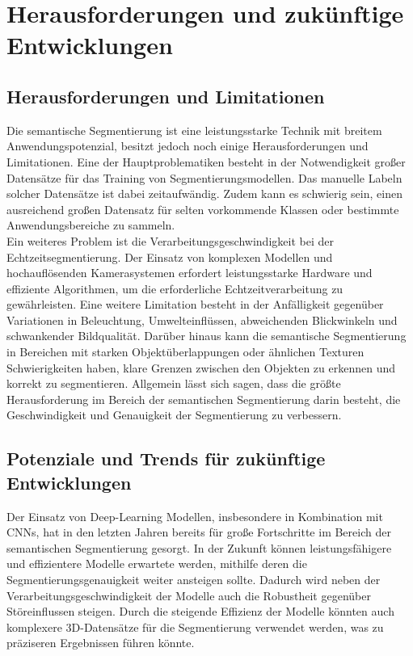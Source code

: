 \chapter{Herausforderungen und zukünftige Entwicklungen}
\section{Herausforderungen und Limitationen}
Die semantische Segmentierung ist eine leistungsstarke Technik mit breitem
Anwendungspotenzial, besitzt jedoch noch einige Herausforderungen und
Limitationen. Eine der Hauptproblematiken besteht in der Notwendigkeit großer
Datensätze für das Training von Segmentierungsmodellen. Das manuelle Labeln
solcher Datensätze ist dabei zeitaufwändig. Zudem kann es schwierig sein, einen
ausreichend großen Datensatz für selten vorkommende Klassen oder bestimmte
Anwendungsbereiche zu sammeln. \cite{hu2021towards} \\Ein weiteres Problem ist
die Verarbeitungsgeschwindigkeit bei der Echtzeitsegmentierung. Der Einsatz von
komplexen Modellen und hochauflösenden Kamerasystemen erfordert leistungsstarke
Hardware und effiziente Algorithmen, um die erforderliche Echtzeitverarbeitung
zu gewährleisten. Eine weitere Limitation besteht in der Anfälligkeit gegenüber
Variationen in Beleuchtung, Umwelteinflüssen, abweichenden Blickwinkeln und
schwankender Bildqualität. Darüber hinaus kann die semantische Segmentierung in
Bereichen mit starken Objektüberlappungen oder ähnlichen Texturen
Schwierigkeiten haben, klare Grenzen zwischen den Objekten zu erkennen und
korrekt zu segmentieren. Allgemein lässt sich sagen, dass die größte
Herausforderung im Bereich der semantischen Segmentierung darin besteht, die
Geschwindigkeit und Genauigkeit der Segmentierung zu
verbessern. \cite{20222324,9420573}

\section{Potenziale und Trends für zukünftige Entwicklungen}

Der Einsatz von Deep-Learning Modellen, insbesondere in Kombination mit CNNs,
hat in den letzten Jahren bereits für große Fortschritte im Bereich der
semantischen Segmentierung gesorgt. In der Zukunft können leistungsfähigere und
effizientere Modelle erwartete werden, mithilfe deren die
Segmentierungsgenauigkeit weiter ansteigen sollte. Dadurch wird neben der
Verarbeitungsgeschwindigkeit der Modelle auch die Robustheit gegenüber
Störeinflussen steigen. Durch die steigende Effizienz der Modelle könnten
auch komplexere 3D-Datensätze für die Segmentierung verwendet werden, was zu
präziseren Ergebnissen führen könnte. \cite{9420573}

